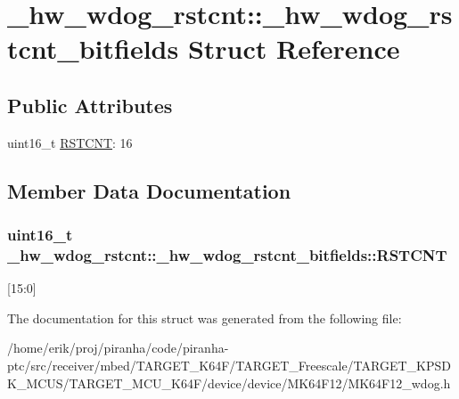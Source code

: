 \hypertarget{struct__hw__wdog__rstcnt_1_1__hw__wdog__rstcnt__bitfields}{}\section{\+\_\+hw\+\_\+wdog\+\_\+rstcnt\+:\+:\+\_\+hw\+\_\+wdog\+\_\+rstcnt\+\_\+bitfields Struct Reference}
\label{struct__hw__wdog__rstcnt_1_1__hw__wdog__rstcnt__bitfields}
\subsection*{Public Attributes}
\begin{DoxyCompactItemize}
\item 
uint16\+\_\+t \hyperlink{struct__hw__wdog__rstcnt_1_1__hw__wdog__rstcnt__bitfields_a3c86583fbf8f891bdc4072cad02dbc70}{R\+S\+T\+C\+NT}\+: 16
\end{DoxyCompactItemize}


\subsection{Member Data Documentation}
\subsubsection[{\texorpdfstring{R\+S\+T\+C\+NT}{RSTCNT}}]{\setlength{\rightskip}{0pt plus 5cm}uint16\+\_\+t \+\_\+hw\+\_\+wdog\+\_\+rstcnt\+::\+\_\+hw\+\_\+wdog\+\_\+rstcnt\+\_\+bitfields\+::\+R\+S\+T\+C\+NT}\hypertarget{struct__hw__wdog__rstcnt_1_1__hw__wdog__rstcnt__bitfields_a3c86583fbf8f891bdc4072cad02dbc70}{}\label{struct__hw__wdog__rstcnt_1_1__hw__wdog__rstcnt__bitfields_a3c86583fbf8f891bdc4072cad02dbc70}
\mbox{[}15\+:0\mbox{]} 

The documentation for this struct was generated from the following file\+:\begin{DoxyCompactItemize}
\item 
/home/erik/proj/piranha/code/piranha-\/ptc/src/receiver/mbed/\+T\+A\+R\+G\+E\+T\+\_\+\+K64\+F/\+T\+A\+R\+G\+E\+T\+\_\+\+Freescale/\+T\+A\+R\+G\+E\+T\+\_\+\+K\+P\+S\+D\+K\+\_\+\+M\+C\+U\+S/\+T\+A\+R\+G\+E\+T\+\_\+\+M\+C\+U\+\_\+\+K64\+F/device/device/\+M\+K64\+F12/M\+K64\+F12\+\_\+wdog.\+h\end{DoxyCompactItemize}
